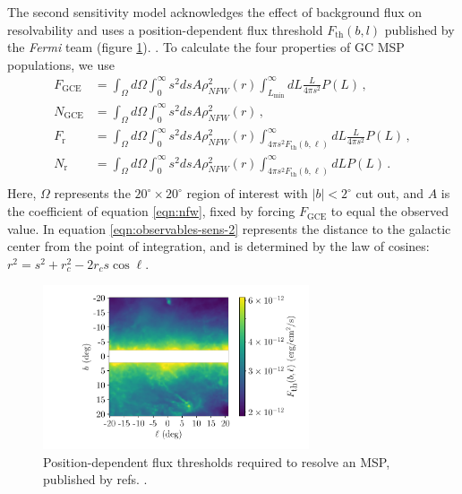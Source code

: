 \documentclass[a4paper,11pt]{article}
\newcommand{\comment}[1]{\emph{\color{red}{#1}}}
\begin{document}
The second sensitivity model acknowledges the effect of background flux on resolvability and uses a position-dependent flux threshold $F_\text{th}(b, l)$ published by the \textit{Fermi} team \cite{Fermi-LAT:2019yla, Ballet:2020hze} (figure \ref{fig:sensitivity}). \comment{Here, I could talk about how to convert between flux and luminosity and then use the mean of this map to assess how accurate 1e34 ergs/s actually is.}. To calculate the four properties of GC MSP populations, we use
\begin{equation}
    \begin{split}
        F_\text{GCE} &= \int_\Omega d\Omega \int_0^\infty s^2 ds A \rho_{NFW}^2(r)\int_{L_\text{min}}^\infty dL \frac{L}{4\pi s^2}P(L)\,, \\
        N_\text{GCE} &= \int_\Omega d\Omega \int_0^\infty s^2 ds A \rho_{NFW}^2(r)\,, \\
        F_\text{r} &= \int_\Omega d\Omega \int_0^\infty s^2 ds A \rho_{NFW}^2(r)\int_{4\pi s^2F_\text{th}(b,\ell)}^\infty dL \frac{L}{4\pi s^2}P(L)\,, \\
        N_\text{r} &= \int_\Omega d\Omega \int_0^\infty s^2 ds A \rho_{NFW}^2(r)\int_{4\pi s^2F_\text{th}(b,\ell)}^\infty dL P(L) \,. \\
        \label{eqn:observables-sens-2}
    \end{split}
\end{equation}
Here, $\Omega$ represents the $20^\circ \times 20^\circ$ region of interest with $|b| < 2^\circ$ cut out, and $A$ is the coefficient of equation \ref{eqn:nfw}, fixed by forcing $F_\text{GCE}$ to equal the observed value. In equation \ref{eqn:observables-sens-2} represents the distance to the galactic center from the point of integration, and is determined by the law of cosines:
$r^2 = s^2 + r_c^2 - 2r_c s \cos \ell$.

\begin{figure}
    \centering
    \includegraphics[width=0.7\textwidth]{figs/sensitivity-map.pdf}
    \caption{Position-dependent flux thresholds required to resolve an MSP, published by refs. \cite{Fermi-LAT:2019yla, Ballet:2020hze}. \comment{Maybe I shouldn't show this plot. It's barely original; just a display of a FITS file pulled from the 4FGL website. But I could overlay the previous figure of where the 47 point sources are. Would that be useful?}}
    \label{fig:sensitivity}
\end{figure}
\end{document}
